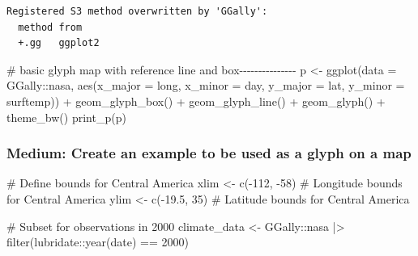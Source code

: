 \documentclass[
  letterpaper,
  DIV=11,
  numbers=noendperiod]{scrartcl}
\newenvironment{Shaded}{\begin{snugshade}}{\end{snugshade}}
\newcommand{\AttributeTok}[1]{\textcolor[rgb]{0.40,0.45,0.13}{#1}}
\newcommand{\CommentTok}[1]{\textcolor[rgb]{0.37,0.37,0.37}{#1}}
\newcommand{\DecValTok}[1]{\textcolor[rgb]{0.68,0.00,0.00}{#1}}
\newcommand{\FloatTok}[1]{\textcolor[rgb]{0.68,0.00,0.00}{#1}}
\newcommand{\FunctionTok}[1]{\textcolor[rgb]{0.28,0.35,0.67}{#1}}
\newcommand{\NormalTok}[1]{\textcolor[rgb]{0.00,0.23,0.31}{#1}}
\newcommand{\OtherTok}[1]{\textcolor[rgb]{0.00,0.23,0.31}{#1}}
\newcommand{\SpecialCharTok}[1]{\textcolor[rgb]{0.37,0.37,0.37}{#1}}
\begin{document}
\begin{verbatim}
Registered S3 method overwritten by 'GGally':
  method from   
  +.gg   ggplot2
\end{verbatim}

\begin{Shaded}
\begin{Highlighting}[]
\CommentTok{\# basic glyph map with reference line and box{-}{-}{-}{-}{-}{-}{-}{-}{-}{-}{-}{-}{-}{-}{-}}
\NormalTok{p }\OtherTok{\textless{}{-}} \FunctionTok{ggplot}\NormalTok{(}\AttributeTok{data =}\NormalTok{ GGally}\SpecialCharTok{::}\NormalTok{nasa,}
       \FunctionTok{aes}\NormalTok{(}\AttributeTok{x\_major =}\NormalTok{ long, }\AttributeTok{x\_minor =}\NormalTok{ day,}
           \AttributeTok{y\_major =}\NormalTok{ lat, }\AttributeTok{y\_minor =}\NormalTok{ surftemp)) }\SpecialCharTok{+}
  \FunctionTok{geom\_glyph\_box}\NormalTok{() }\SpecialCharTok{+}
  \FunctionTok{geom\_glyph\_line}\NormalTok{() }\SpecialCharTok{+}
  \FunctionTok{geom\_glyph}\NormalTok{() }\SpecialCharTok{+}
  \FunctionTok{theme\_bw}\NormalTok{()}
\FunctionTok{print\_p}\NormalTok{(p)}
\end{Highlighting}
\end{Shaded}

\hypertarget{medium-create-an-example-to-be-used-as-a-glyph-on-a-map}{%
\subsubsection{Medium: Create an example to be used as a glyph on a
map}\label{medium-create-an-example-to-be-used-as-a-glyph-on-a-map}}

\begin{Shaded}
\begin{Highlighting}[]
\CommentTok{\# Define bounds for Central America}
\NormalTok{xlim }\OtherTok{\textless{}{-}} \FunctionTok{c}\NormalTok{(}\SpecialCharTok{{-}}\DecValTok{112}\NormalTok{, }\SpecialCharTok{{-}}\DecValTok{58}\NormalTok{) }\CommentTok{\# Longitude bounds for Central America}
\NormalTok{ylim }\OtherTok{\textless{}{-}} \FunctionTok{c}\NormalTok{(}\SpecialCharTok{{-}}\FloatTok{19.5}\NormalTok{, }\DecValTok{35}\NormalTok{) }\CommentTok{\# Latitude bounds for Central America}


\CommentTok{\# Subset for observations in 2000}
\NormalTok{climate\_data }\OtherTok{\textless{}{-}}\NormalTok{ GGally}\SpecialCharTok{::}\NormalTok{nasa }\SpecialCharTok{|\textgreater{}}
  \FunctionTok{filter}\NormalTok{(lubridate}\SpecialCharTok{::}\FunctionTok{year}\NormalTok{(date) }\SpecialCharTok{==} \DecValTok{2000}\NormalTok{)}
\end{Highlighting}
\end{Shaded}
\end{document}
